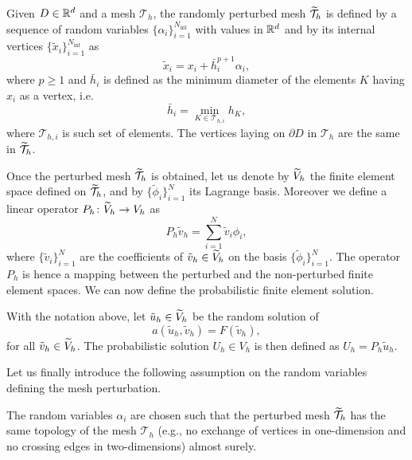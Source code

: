 \documentclass[10pt]{article}
\begin{document}
\begin{definition} \label{def:RandomMesh} Given $D \in \mathbb{R}^d$ and a mesh $\mathcal T_h$, the randomly perturbed mesh $\widetilde {\mathcal T}_h$ is defined by a sequence of random variables $\{\alpha_i\}_{i=1}^{N_{\mathrm{int}}}$ with values in $\mathbb{R}^d$ and by its internal vertices $\{\tilde x_i\}_{i=1}^{N_{\mathrm{int}}}$ as
	\begin{equation}
	\tilde x_i = x_i + \bar h_i^{p+1} \alpha_i, 
	\end{equation}
	where $p \geq 1$ and $\bar h_i$ is defined as the minimum diameter of the elements $K$ having $x_i$ as a vertex, i.e.
	\begin{equation}
	\bar h_i = \min_{K \in \mathcal T_{h,i}} h_K,
	\end{equation}
	where $\mathcal T_{h, i}$ is such set of elements. The vertices laying on $\partial D$ in $\mathcal T_h$ are the same in $\widetilde {\mathcal T}_h$.
\end{definition}

Once the perturbed mesh $\widetilde {\mathcal T}_h$ is obtained, let us denote by $\widetilde V_h$ the finite element space defined on $\widetilde {\mathcal T}_h$, and by $\{\tilde \phi_i\}_{i=1}^N$ its Lagrange basis. Moreover we define a linear operator $P_h \colon \widetilde V_h \to V_h$ as
\begin{equation}
	P_h \tilde v_h = \sum_{i=1}^N \tilde v_i \phi_i,
\end{equation}
where $\{\tilde v_i\}_{i=1}^N$ are the coefficients of $\tilde v_h \in \widetilde V_h$ on the basis $\{\tilde \phi_i\}_{i=1}^N$. The operator $P_h$ is hence a mapping between the perturbed and the non-perturbed finite element spaces. We can now define the probabilistic finite element solution.

\begin{definition} \label{def:ProbSolution} With the notation above, let $\tilde u_h \in \widetilde V_h$ be the random solution of 
	\begin{equation}
		a(\tilde u_h, \tilde v_h) = F(\tilde v_h),
	\end{equation}
	for all $\tilde v_h \in \widetilde V_h$. The probabilistic solution $U_h \in V_h$ is then defined as $U_h = P_h \tilde u_h$. 
\end{definition}

Let us finally introduce the following assumption on the random variables defining the mesh perturbation. 
\begin{assumption} \label{as:MeshPerturbation}  The random variables $\alpha_i$ are chosen such that the perturbed mesh $\widetilde {\mathcal T}_h$ has the same topology of the mesh $\mathcal T_h$ (e.g., no exchange of vertices in one-dimension and no crossing edges in two-dimensions) almost surely.
\end{assumption}
\end{document}

